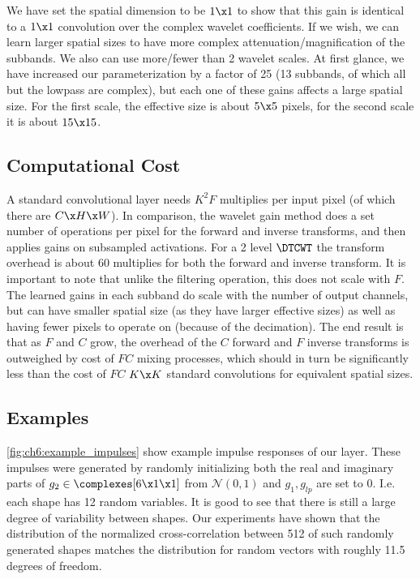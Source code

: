 We have set the spatial dimension to be $1\x 1$ to show that this gain is
identical to a $1\x 1$ convolution over the complex wavelet coefficients. If we
wish, we can learn larger spatial sizes to have more complex
attenuation/magnification of the subbands. We also can use more/fewer than
2 wavelet scales.  At first glance, we have increased our parameterization by
a factor of 25 (13 subbands, of which all but the lowpass are complex), but
each one of these gains affects a large spatial size. For the first scale, the
effective size is about $5\x 5$ pixels, for the second scale it is about $15\x
15$.

\subsection{Computational Cost}
A standard convolutional layer needs $K^2 F$ multiplies per input pixel (of
which there are $C\x H\x W$). In comparison, the wavelet gain method does a set
number of operations per pixel for the forward and inverse transforms, and then
applies gains on subsampled activations. For a 2 level $\DTCWT$ the transform
overhead is about 60 multiplies for both the forward and inverse transform. It
is important to note that unlike the filtering operation, this does not scale
with $F$. The learned gains in each subband do scale with the number of output
channels, but can have smaller spatial size (as they have larger effective
sizes) as well as having fewer pixels to operate on (because of the decimation).
The end result is that as $F$ and $C$ grow, the overhead of the $C$ forward and
$F$ inverse transforms is outweighed by cost of $FC$ mixing processes, which
should in turn be significantly less than the cost of $FC$ $K\x K$ standard
convolutions for equivalent spatial sizes.


\subsection{Examples}
\autoref{fig:ch6:example_impulses} show example impulse responses of our layer.
These impulses were generated by randomly initializing both the real and
imaginary parts of $g_2 \in \complexes[6\x 1\x 1]$ from $\mathcal{N}(0,1)$ and
$g_1, g_{lp}$ are set to 0. I.e. each shape has 12 random variables. It is good
to see that there is still a large degree of variability between shapes. Our
experiments have shown that the distribution of the normalized cross-correlation
between 512 of such randomly generated shapes matches the distribution for
random vectors with roughly 11.5 degrees of freedom.

